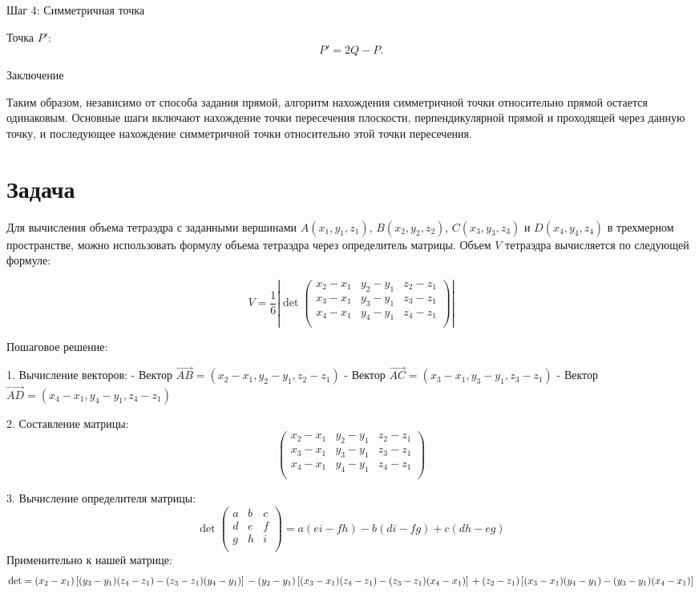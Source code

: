 \documentclass[a4paper,14pt]{extreport} %
\begin{document}
     Шаг 4: Симметричная точка

Точка \(P'\):
\[
P' = 2Q - P.
\]

Заключение

Таким образом, независимо от способа задания прямой, алгоритм нахождения симметричной точки относительно прямой остается одинаковым. Основные шаги включают нахождение точки пересечения плоскости, перпендикулярной прямой и проходящей через данную точку, и последующее нахождение симметричной точки относительно этой точки пересечения.
\section*{Задача}
Для вычисления объема тетраэдра с заданными вершинами \( A(x_1, y_1, z_1) \), \( B(x_2, y_2, z_2) \), \( C(x_3, y_3, z_3) \) и \( D(x_4, y_4, z_4) \) в трехмерном пространстве, можно использовать формулу объема тетраэдра через определитель матрицы. Объем \( V \) тетраэдра вычисляется по следующей формуле:

\[
V = \frac{1}{6} \left| \det \begin{pmatrix}
x_2 - x_1 & y_2 - y_1 & z_2 - z_1 \\
x_3 - x_1 & y_3 - y_1 & z_3 - z_1 \\
x_4 - x_1 & y_4 - y_1 & z_4 - z_1 \\
\end{pmatrix} \right|
\]

 Пошаговое решение: 

1.  Вычисление векторов: 
   - Вектор \( \vec{AB} = (x_2 - x_1, y_2 - y_1, z_2 - z_1) \)
   - Вектор \( \vec{AC} = (x_3 - x_1, y_3 - y_1, z_3 - z_1) \)
   - Вектор \( \vec{AD} = (x_4 - x_1, y_4 - y_1, z_4 - z_1) \)

2.  Составление матрицы: 
   \[
   \begin{pmatrix}
   x_2 - x_1 & y_2 - y_1 & z_2 - z_1 \\
   x_3 - x_1 & y_3 - y_1 & z_3 - z_1 \\
   x_4 - x_1 & y_4 - y_1 & z_4 - z_1 \\
   \end{pmatrix}
   \]

3.  Вычисление определителя матрицы: 
   \[
   \det \begin{pmatrix}
   a & b & c \\
   d & e & f \\
   g & h & i \\
   \end{pmatrix} = a(ei - fh) - b(di - fg) + c(dh - eg)
   \]
   Применительно к нашей матрице:
   \[
   \det = (x_2 - x_1)\left[(y_3 - y_1)(z_4 - z_1) - (z_3 - z_1)(y_4 - y_1)\right] \\
   - (y_2 - y_1)\left[(x_3 - x_1)(z_4 - z_1) - (z_3 - z_1)(x_4 - x_1)\right] \\
   + (z_2 - z_1)\left[(x_3 - x_1)(y_4 - y_1) - (y_3 - y_1)(x_4 - x_1)\right]
   \]
\end{document}
